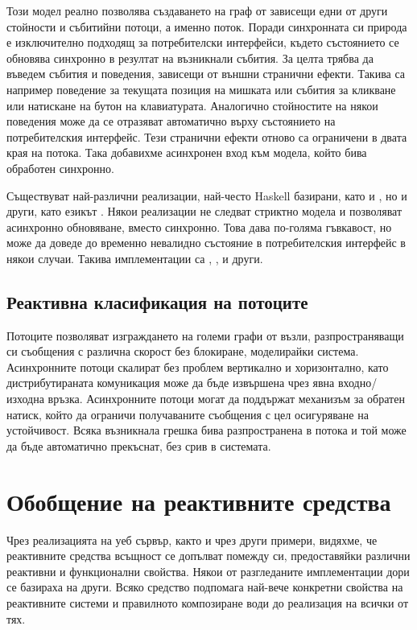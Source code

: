 Този модел реално позволява създаването на граф от зависещи едни от други стойности и събитийни потоци, а именно  поток. Поради синхронната си природа е изключително подходящ за потребителски интерфейси, където състоянието се обновява синхронно в резултат на възникнали събития. За целта трябва да въведем събития и поведения, зависещи от външни странични ефекти. Такива са например поведение за текущата позиция на мишката или събития за кликване или натискане на бутон на клавиатурата. Аналогично стойностите на някои поведения може да се отразяват автоматично върху състоянието на потребителския интерфейс. Тези странични ефекти отново са ограничени в двата края на потока. Така добавихме асинхронен вход към модела, който бива обработен синхронно.

Съществуват най-различни реализации, най-често Haskell базирани, като  и , но и други, като езикът . Някои реализации не следват стриктно модела и позволяват асинхронно обновяване, вместо синхронно. Това дава по-голяма гъвкавост, но може да доведе до временно невалидно състояние в потребителския интерфейс в някои случаи. Такива имплементации са , ,  и други.

\subsection{Реактивна класификация на потоците}

Потоците позволяват изграждането на големи графи от възли, разпространяващи си съобщения с различна скорост без блокиране, моделирайки  система. Асинхронните потоци скалират без проблем вертикално и хоризонтално, като дистрибутираната комуникация може да бъде извършена чрез явна входно/изходна връзка. Асинхронните потоци могат да поддържат механизъм за обратен натиск, който да ограничи получаваните съобщения с цел осигуряване на устойчивост. Всяка възникнала грешка бива разпространена в потока и той може да бъде автоматично прекъснат, без срив в системата.

\section{Обобщение на реактивните средства}

Чрез реализацията на уеб сървър, както и чрез други примери, видяхме, че реактивните средства всъщност се допълват помежду си, предоставяйки различни реактивни и функционални свойства. Някои от разгледаните имплементации дори се базираха на други. Всяко средство подпомага най-вече конкретни свойства на реактивните системи и правилното композиране води до реализация на всички от тях.
